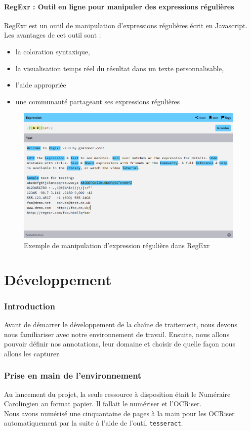 \documentclass[a4paper, 11pt]{report}
\begin{document}
\subsection{RegExr : Outil en ligne pour manipuler des expressions régulières}
RegExr est un outil de manipulation d’expressions régulières écrit en Javascript.
Les avantages de cet outil sont : 
\begin{itemize}
\item la coloration syntaxique,
\item la visualisation temps réel du résultat dans un texte personnalisable,
\item l'aide appropriée
\item une communauté partageant ses expressions régulières
\end{itemize}
\begin{figure}[h]
\begin{center}
\includegraphics[scale=0.3]{img/regexr.png} 
\end{center}
\caption{Exemple de manipulation d'expression régulière dans RegExr}
\end{figure}
\part{Développement}
	\section*{Introduction}
	Avant de démarrer le développement de la chaîne de traitement, nous devons nous familiariser avec notre environnement de travail. Ensuite, nous allons pouvoir définir nos annotations, leur domaine et choisir de quelle façon nous allons les capturer.
	\section{Prise en main de l'environnement}
	Au lancement du projet, la seule ressource à disposition était le Numéraire Carolingien au format papier. Il fallait le numériser et l'OCRiser.\\
    Nous avons numérisé une cinquantaine de pages à la main pour les OCRiser automatiquement par la suite à l'aide de l'outil \texttt{tesseract}.\\
\end{document}
